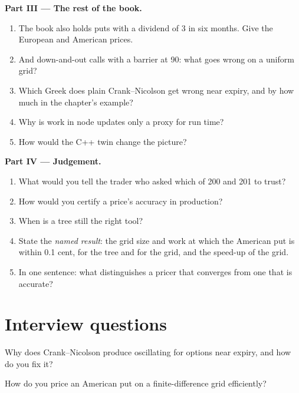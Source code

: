 \begin{problem}
\medskip\noindent\textbf{Part III --- The rest of the book.}
\begin{enumerate}[resume]
\item The book also holds puts with a dividend of 3 in six months. Give the European and American prices.
\item And down-and-out calls with a barrier at 90: what goes wrong on a uniform grid?
\item Which Greek does plain Crank--Nicolson get wrong near expiry, and by how much in the chapter's example?
\item Why is work in node updates only a proxy for run time?
\item How would the C++ twin change the picture?
\end{enumerate}

\medskip\noindent\textbf{Part IV --- Judgement.}
\begin{enumerate}[resume]
\item What would you tell the trader who asked which of 200 and 201 to trust?
\item How would you certify a price's accuracy in production?
\item When is a tree still the right tool?
\item State the \emph{named result}: the grid size and work at which the American put is within 0.1 cent, for the tree and for the grid, and the speed-up of
the grid.
\item In one sentence: what distinguishes a pricer that converges from one that is accurate?
\end{enumerate}
\end{problem}

\section{Interview questions}

\begin{interviewq}\label{iq:dv:trees-and-finite-difference-pricers-in-practice:1}
Why does Crank--Nicolson produce oscillating  for options near expiry, and how do you fix it?
\end{interviewq}

\begin{interviewq}\label{iq:dv:trees-and-finite-difference-pricers-in-practice:2}
How do you price an American put on a finite-difference grid efficiently?
\end{interviewq}

